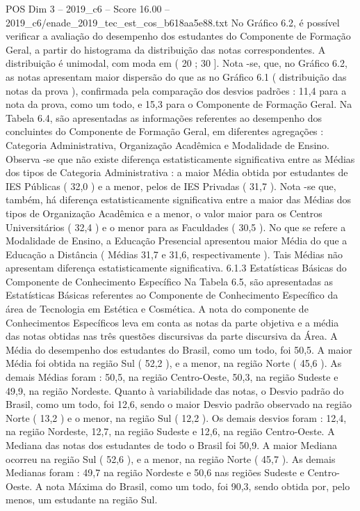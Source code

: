 \begin{textsample}{POS Dim 3 – 2019\_c6 – Score 16.00 – 2019\_c6/enade\_2019\_tec\_est\_cos\_b618aa5e88.txt}
No Gráfico 6.2, é possível verificar a avaliação do desempenho dos estudantes do Componente de Formação Geral, a partir do histograma da distribuição das notas correspondentes.
A distribuição é unimodal, com moda em ( 20 ; 30 ].
Nota -se, que, no Gráfico 6.2, as notas apresentam maior dispersão do que as no Gráfico 6.1 ( distribuição das notas da prova ), confirmada pela comparação dos desvios padrões : 11,4 para a nota da prova, como um todo, e 15,3 para o Componente de Formação Geral.
Na Tabela 6.4, são apresentadas as informações referentes ao desempenho dos concluintes do Componente de Formação Geral, em diferentes agregações : Categoria Administrativa, Organização Acadêmica e Modalidade de Ensino.
Observa -se que não existe diferença estatisticamente significativa entre as Médias dos tipos de Categoria Administrativa : a maior Média obtida por estudantes de IES Públicas ( 32,0 ) e a menor, pelos de IES Privadas ( 31,7 ).
Nota -se que, também, há diferença estatisticamente significativa entre a maior das Médias dos tipos de Organização Acadêmica e a menor, o valor maior para os Centros Universitários ( 32,4 ) e o menor para as Faculdades ( 30,5 ).
No que se refere a Modalidade de Ensino, a Educação Presencial apresentou maior Média do que a Educação a Distância ( Médias 31,7 e 31,6, respectivamente ).
Tais Médias não apresentam diferença estatisticamente significativa. 6.1.3 Estatísticas Básicas do Componente de Conhecimento Específico Na Tabela 6.5, são apresentadas as Estatísticas Básicas referentes ao Componente de Conhecimento Específico da área de Tecnologia em Estética e Cosmética.
A nota do componente de Conhecimentos Específicos leva em conta as notas da parte objetiva e a média das notas obtidas nas três questões discursivas da parte discursiva da Área.
A Média do desempenho dos estudantes do Brasil, como um todo, foi 50,5.
A maior Média foi obtida na região Sul ( 52,2 ), e a menor, na região Norte ( 45,6 ).
As demais Médias foram : 50,5, na região Centro-Oeste, 50,3, na região Sudeste e 49,9, na região Nordeste.
Quanto à variabilidade das notas, o Desvio padrão do Brasil, como um todo, foi 12,6, sendo o maior Desvio padrão observado na região Norte ( 13,2 ) e o menor, na região Sul ( 12,2 ).
Os demais desvios foram : 12,4, na região Nordeste, 12,7, na região Sudeste e 12,6, na região Centro-Oeste.
A Mediana das notas dos estudantes de todo o Brasil foi 50,9.
A maior Mediana ocorreu na região Sul ( 52,6 ), e a menor, na região Norte ( 45,7 ).
As demais Medianas foram : 49,7 na região Nordeste e 50,6 nas regiões Sudeste e Centro-Oeste.
A nota Máxima do Brasil, como um todo, foi 90,3, sendo obtida por, pelo menos, um estudante na região Sul.

\end{textsample}
